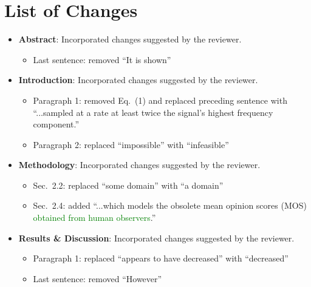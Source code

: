 \documentclass[a4paper,12pt]{article}
\begin{document}
\section*{List of Changes}

\begin{itemize}
	\item \textbf{Abstract}: Incorporated changes suggested by the reviewer.
	\begin{itemize}
		\item Last sentence: removed ``It is shown''
	\end{itemize}
	
	\item \textbf{Introduction}: Incorporated changes suggested by the reviewer.
	\begin{itemize}
		\item Paragraph 1: removed Eq.~(1) and replaced preceding sentence with ``...sampled at a rate at least twice the signal's highest frequency component.''
		\item Paragraph 2: replaced ``impossible'' with ``infeasible''
	\end{itemize}
	\item \textbf{Methodology}: Incorporated changes suggested by the reviewer.
	\begin{itemize}
		\item Sec.~2.2: replaced ``some domain'' with ``a domain''
		\item Sec.~2.4: added ``...which models the obsolete mean opinion scores (MOS) \textcolor{Green}{obtained from human observers}.''
	\end{itemize}
	\item \textbf{Results \& Discussion}: Incorporated changes suggested by the reviewer.
	\begin{itemize}
		\item Paragraph 1: replaced ``appears to have decreased'' with ``decreased''
		\item Last sentence: removed ``However''
	\end{itemize}
\end{itemize}
\end{document}
